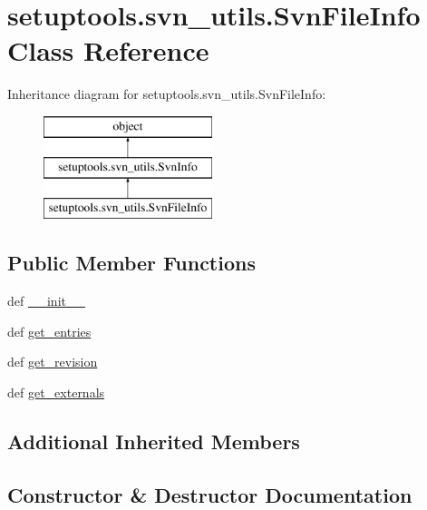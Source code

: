 \hypertarget{classsetuptools_1_1svn__utils_1_1SvnFileInfo}{}\section{setuptools.\+svn\+\_\+utils.\+Svn\+File\+Info Class Reference}
\label{classsetuptools_1_1svn__utils_1_1SvnFileInfo}
Inheritance diagram for setuptools.\+svn\+\_\+utils.\+Svn\+File\+Info\+:\begin{figure}[H]
\begin{center}
\leavevmode
\includegraphics[height=3.000000cm]{classsetuptools_1_1svn__utils_1_1SvnFileInfo}
\end{center}
\end{figure}
\subsection*{Public Member Functions}
\begin{DoxyCompactItemize}
\item 
def \hyperlink{classsetuptools_1_1svn__utils_1_1SvnFileInfo_aa166e26745bc0eebbb441e40863da2b9}{\+\_\+\+\_\+init\+\_\+\+\_\+}
\item 
def \hyperlink{classsetuptools_1_1svn__utils_1_1SvnFileInfo_a43c021a42ee046423da40148ca8257b8}{get\+\_\+entries}
\item 
def \hyperlink{classsetuptools_1_1svn__utils_1_1SvnFileInfo_a1ead32e70d23ed275b72d331a3216709}{get\+\_\+revision}
\item 
def \hyperlink{classsetuptools_1_1svn__utils_1_1SvnFileInfo_afb72fd1d33aced0e7c28f078c9720c14}{get\+\_\+externals}
\end{DoxyCompactItemize}
\subsection*{Additional Inherited Members}


\subsection{Constructor \& Destructor Documentation}
\hypertarget{classsetuptools_1_1svn__utils_1_1SvnFileInfo_aa166e26745bc0eebbb441e40863da2b9}{}
